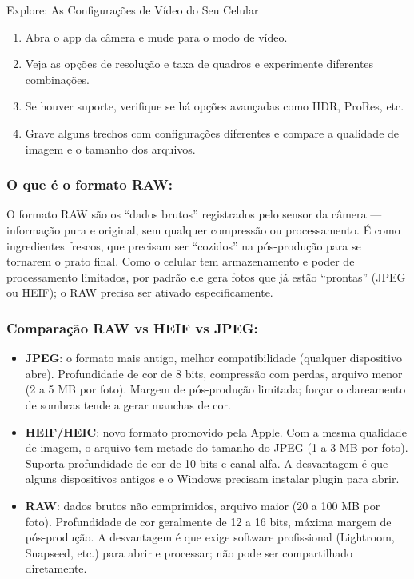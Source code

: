 \begin{tcbpractice}{Explore: As Configurações de Vídeo do Seu Celular}
\begin{enumerate}
  \item Abra o app da câmera e mude para o modo de vídeo.
  \item Veja as opções de resolução e taxa de quadros e experimente diferentes combinações.
  \item Se houver suporte, verifique se há opções avançadas como HDR, ProRes, etc.
  \item Grave alguns trechos com configurações diferentes e compare a qualidade de imagem e o tamanho dos arquivos.
\end{enumerate}

\end{tcbpractice}


\subsubsection*{O que é o formato RAW:}

O formato RAW são os “dados brutos” registrados pelo sensor da câmera — informação pura e original, sem qualquer compressão ou processamento. É como ingredientes frescos, que precisam ser “cozidos” na pós-produção para se tornarem o prato final. Como o celular tem armazenamento e poder de processamento limitados, por padrão ele gera fotos que já estão “prontas” (JPEG ou HEIF); o RAW precisa ser ativado especificamente.

\subsubsection*{Comparação RAW vs HEIF vs JPEG:}

\begin{itemize}
  \item \textbf{JPEG}: o formato mais antigo, melhor compatibilidade (qualquer dispositivo abre). Profundidade de cor de 8 bits, compressão com perdas, arquivo menor (2 a 5 MB por foto). Margem de pós-produção limitada; forçar o clareamento de sombras tende a gerar manchas de cor.
  \item \textbf{HEIF/HEIC}: novo formato promovido pela Apple. Com a mesma qualidade de imagem, o arquivo tem metade do tamanho do JPEG (1 a 3 MB por foto). Suporta profundidade de cor de 10 bits e canal alfa. A desvantagem é que alguns dispositivos antigos e o Windows precisam instalar plugin para abrir.
  \item \textbf{RAW}: dados brutos não comprimidos, arquivo maior (20 a 100 MB por foto). Profundidade de cor geralmente de 12 a 16 bits, máxima margem de pós-produção. A desvantagem é que exige software profissional (Lightroom, Snapseed, etc.) para abrir e processar; não pode ser compartilhado diretamente.
\end{itemize}

